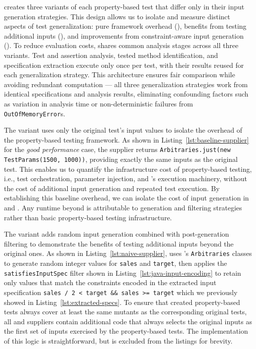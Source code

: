 \ToolTeralizer{} creates three variants of each property-based test
that differ only in their input generation strategies.
This design allows us to isolate
and measure distinct aspects of test generalization:
pure framework overhead (\VariantBaseline{}),
benefits from testing additional inputs (\VariantNaive{}),
and improvements from constraint-aware input generation (\VariantImproved{}).
To reduce evaluation costs,
\ToolTeralizer{} shares common analysis stages across all three variants.
Test and assertion analysis, tested method identification, and specification extraction
execute only once per test, with their results reused for each generalization strategy.
This architecture ensures fair comparison
while avoiding redundant computation --- all three generalization strategies work from identical specifications
and analysis results, eliminating confounding factors
such as variation in analysis time or non-deterministic failures from \texttt{OutOfMemoryError}s.

The \textbf{\VariantBaseline{}} variant uses only the original test's input values
to isolate the overhead of the property-based testing framework.
As shown in Listing~\ref{lst:baseline-supplier} for the \textit{good performance} case,
the supplier returns \texttt{Arbitraries.just(new TestParams(1500, 1000))},
providing exactly the same inputs as the original test.
This enables us to quantify the infrastructure cost of property-based testing,
i.e., test orchestration, parameter injection, and \ToolJqwik{}'s execution machinery,
without the cost of additional input generation and repeated test execution.
By establishing this baseline overhead,
we can isolate the cost of input generation in \VariantNaive{} and \VariantImproved{}.
Any runtime beyond \VariantBaseline{} is attributable to generation and filtering strategies
rather than basic property-based testing infrastructure.

The \textbf{\VariantNaive{}} variant adds random input generation combined with post-generation filtering
to demonstrate the benefits of testing additional inputs beyond the original ones.
As shown in Listing~\ref{lst:naive-supplier},
\ToolTeralizer{} uses \ToolJqwik{}'s \texttt{Arbitraries} classes
to generate random integer values for \texttt{sales} and \texttt{target},
then applies the \texttt{satisfiesInputSpec} filter shown in Listing~\ref{lst:java-input-encoding}
to retain only values that match the constraints encoded in the extracted input specification
\texttt{sales / 2 < target \&\& sales >= target}
which we previously showed in Listing~\ref{lst:extracted-specs}.
To ensure that created property-based tests
always cover at least the same mutants as the corresponding original tests,
all \VariantNaive{} and \VariantImproved{} suppliers
contain additional code that always selects the original inputs
as the first set of inputs exercised by the property-based tests.
The implementation of this logic is straightforward,
but is excluded from the listings for brevity.

